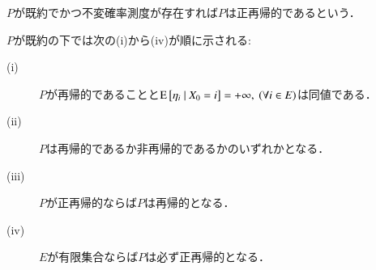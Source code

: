 	\begin{dfn}[正再帰性]
		$P$が既約でかつ不変確率測度が存在すれば$P$は正再帰的であるという． 
	\end{dfn}
	
	\begin{prp}
		$P$が既約の下では次の(i)から(iv)が順に示される:
		\begin{description}
			\item[\rm{(i)}] $P$が再帰的であることと$\operatorname{E} \left[ \eta_i \ \middle|\ X_0 = i \right] = +\infty, \ (\forall i \in E)$は同値である．
			\item[\rm{(ii)}] $P$は再帰的であるか非再帰的であるかのいずれかとなる．
			\item[\rm{(iii)}] $P$が正再帰的ならば$P$は再帰的となる．
			\item[\rm{(iv)}] $E$が有限集合ならば$P$は必ず正再帰的となる．
		\end{description}
	\end{prp}
	
